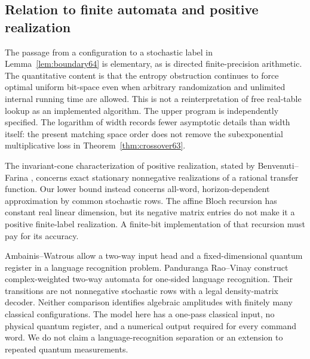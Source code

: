\subsection{Relation to finite automata and positive realization}
The passage from a configuration to a stochastic label in
Lemma~\ref{lem:boundary64} is elementary, as is directed finite-precision
arithmetic. The quantitative content is that the entropy obstruction
continues to force optimal uniform bit-space even when arbitrary
randomization and unlimited internal running time are allowed.
This is not a reinterpretation of free real-table lookup as an
implemented algorithm. The upper program is independently specified.
The logarithm of width records fewer asymptotic details than width
itself: the present matching space order does not remove the
subexponential multiplicative loss in Theorem~\ref{thm:crossover63}.

The invariant-cone characterization of positive realization, stated by
Benvenuti--Farina \cite[Theorem~2]{BF64}, concerns exact stationary
nonnegative realizations of a rational transfer function. Our lower
bound instead concerns all-word, horizon-dependent approximation by
common stochastic rows. The affine Bloch recursion has constant real
linear dimension, but its negative matrix entries do not make it a
positive finite-label realization. A finite-bit implementation of that
recursion must pay for its accuracy.

Ambainis--Watrous \cite[Section~2 and Theorem~1]{AW64} allow a two-way
input head and a fixed-dimensional quantum register in a language
recognition problem. Panduranga Rao--Vinay
\cite[Theorem~1]{RV64} construct complex-weighted two-way automata
for one-sided language recognition. Their transitions are not
nonnegative stochastic rows with a legal density-matrix decoder.
Neither comparison identifies algebraic amplitudes with finitely many
classical configurations. The model here has a one-pass classical
input, no physical quantum register, and a numerical output required
for every command word. We do not claim a language-recognition
separation or an extension to repeated quantum measurements.
